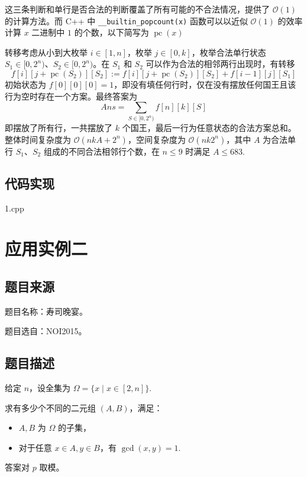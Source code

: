 这三条判断和单行是否合法的判断覆盖了所有可能的不合法情况，提供了
\(\mathcal{O}(1)\) 的计算方法。而 C++ 中
\texttt{\_\_builtin\_popcount(x)} 函数可以以近似 \(\mathcal{O}(1)\)
的效率计算 \(x\) 二进制中 \(1\) 的个数，以下简写为
\(\operatorname{pc}(x)\)

转移考虑从小到大枚举 \(i\in[1,n]\)，枚举 \(j\in[0,k]\)，枚举合法单行状态
\(S_1\in[0,2^n)\)、\(S_2\in[0,2^n)\)。在 \(S_1\) 和 \(S_2\)
可以作为合法的相邻两行出现时，有转移 \[
f[i][j+\operatorname{pc}(S_2)][S_2]:=f[i][j+\operatorname{pc}(S_2)][S_2]+f[i-1][j][S_1]
\] 初始状态为
\(f[0][0][0]=1\)，即没有填任何行时，仅在没有摆放任何国王且该行为空时存在一个方案。最终答案为
\[
Ans=\sum_{S\in[0,2^n)}f[n][k][S]
\] 即摆放了所有行，一共摆放了 \(k\)
个国王，最后一行为任意状态的合法方案总和。整体时间复杂度为
\(\mathcal{O}(nkA+2^n)\)，空间复杂度为 \(\mathcal{O}(nk2^n)\)，其中
\(A\) 为合法单行 \(S_1\)、\(S_2\) 组成的不同合法相邻行个数，在
\(n\le 9\) 时满足 \(A\le 683\).

\subsection{代码实现}

1.cpp

\section{应用实例二}

\subsection{题目来源}

题目名称：寿司晚宴。

题目选自：NOI2015。

\subsection{题目描述}

给定 \(n\)，设全集为 \(\Omega=\{x\mid x\in[2,n]\}\).

求有多少个不同的二元组 \((A,B)\)，满足：

\begin{itemize}

\item
  \(A,B\) 为 \(\Omega\) 的子集，
\item
  对于任意 \(x\in A,y\in B\)，有 \(\gcd(x,y)=1\).
\end{itemize}

答案对 \(p\) 取模。

